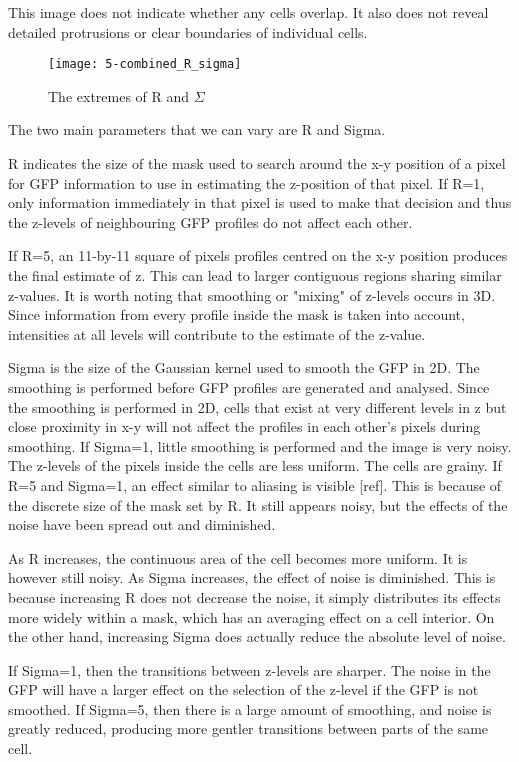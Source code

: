 This image does not indicate whether any cells overlap. It also does not reveal detailed protrusions or clear boundaries of individual cells.

\begin{figure}[htbp!]
\centering
\texttt{[image: 5-combined\_R\_sigma]}
\caption{The extremes of R and $\Sigma$}
\label{fig:r_and_sigma}
\end{figure}

The two main parameters that we can vary are R and Sigma.

R indicates the size of the mask used to search around the x-y position of a pixel for GFP information to use in estimating the z-position of that pixel. If R=1, only information immediately in that pixel is used to make that decision and thus the z-levels of neighbouring GFP profiles do not affect each other.

If R=5, an 11-by-11 square of pixels profiles centred on the x-y position produces the final estimate of z. This can lead to larger contiguous regions sharing similar z-values. It is worth noting that smoothing or "mixing" of z-levels occurs in 3D. Since information from every profile inside the mask is taken into account, intensities at all levels will contribute to the estimate of the z-value.

Sigma is the size of the Gaussian kernel used to smooth the GFP in 2D. The smoothing is performed before GFP profiles are generated and analysed. Since the smoothing is performed in 2D, cells that exist at very different levels in z but close proximity in x-y will not affect the profiles in each other's pixels during smoothing. If Sigma=1, little smoothing is performed and the image is very noisy. The z-levels of the pixels inside the cells are less uniform. The cells are grainy. If R=5 and Sigma=1, an effect similar to aliasing is visible [ref]. This is because of the discrete size of the mask set by R. It still appears noisy, but the effects of the noise have been spread out and diminished.

As R increases, the continuous area of the cell becomes more uniform. It is however still noisy. As Sigma increases, the effect of noise is diminished. This is because increasing R does not decrease the noise, it simply distributes its effects more widely within a mask, which has an averaging effect on a cell interior. On the other hand, increasing Sigma does actually reduce the absolute level of noise.

If Sigma=1, then the transitions between z-levels are sharper. The noise in the GFP will have a larger effect on the selection of the z-level if the GFP is not smoothed. If Sigma=5, then there is a large amount of smoothing, and noise is greatly reduced, producing more gentler transitions between parts of the same cell.

